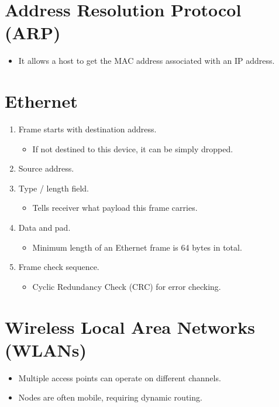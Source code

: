 \documentclass{article}
\begin{document}
\section{Address Resolution Protocol (ARP)}

\begin{itemize}
    \item It allows a host to get the MAC address associated with an IP address.
\end{itemize}

\section{Ethernet}

\begin{enumerate}
    \item Frame starts with destination address.
    \begin{itemize}
        \item If not destined to this device, it can be simply dropped.
    \end{itemize}
    \item Source address.
    \item Type / length field.
    \begin{itemize}
        \item Tells receiver what payload this frame carries.
    \end{itemize}
    \item Data and pad.
    \begin{itemize}
        \item Minimum length of an Ethernet frame is 64 bytes in total.
    \end{itemize}
    \item Frame check sequence.
    \begin{itemize}
        \item Cyclic Redundancy Check (CRC) for error checking.
    \end{itemize}
\end{enumerate}

\section{Wireless Local Area Networks (WLANs)}

\begin{itemize}
    \item Multiple access points can operate on different channels.
    \item Nodes are often mobile, requiring dynamic routing.
\end{itemize}
\end{document}
